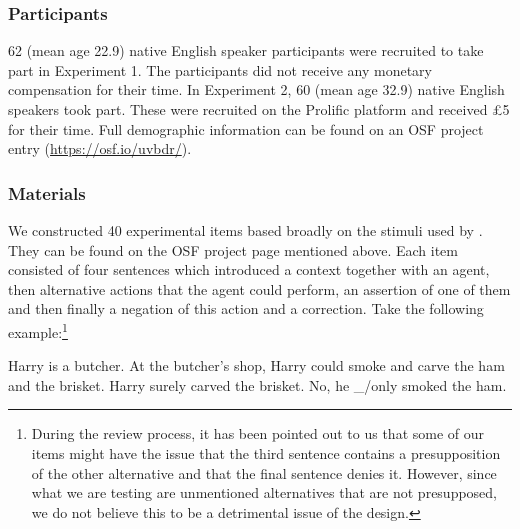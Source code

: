 \documentclass[output=paper,colorlinks,citecolor=brown]{langscibook}
\begin{document}
\subsubsection{Participants}

62 (mean age 22.9) native English speaker participants were recruited to take part in Experiment 1. The participants did not receive any monetary compensation for their time. In Experiment 2, 60 (mean age 32.9) native English speakers took part. These were recruited on the Prolific platform and received £5 for their time. Full demographic information can be found on an OSF project entry (\url{https://osf.io/uvbdr/}).

\subsubsection{Materials}

We constructed 40 experimental items based broadly on the stimuli used by \citet{gotzner2016impact}. They can be found on the OSF project page mentioned above. Each item consisted of four sentences which introduced a context together with an agent, then alternative actions that the agent could perform, an assertion of one of them and then finally a negation of this action and a correction. Take the following example:\footnote{During the review process, it has been pointed out to us that some of our items might have the issue that the third sentence contains a presupposition of the other alternative and that the final sentence denies it. However, since what we are testing are unmentioned alternatives that are not presupposed, we do not believe this to be a detrimental issue of the design.}

\ea\label{ex:ex8} Harry is a butcher.
\ex\label{ex:ex9} At the butcher's shop, Harry could smoke and carve the ham and the brisket.
\ex\label{ex:ex10} Harry surely carved the brisket.
\ex\label{ex:ex11} No, he \_/only smoked the ham.
\z
\end{document}
